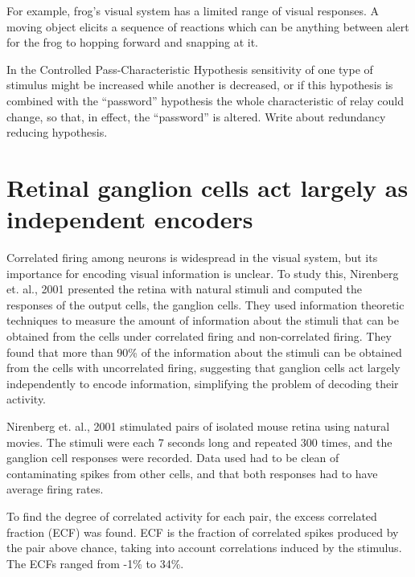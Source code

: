 \documentclass[twoside]{article}
\begin{document}
\begin{multicols}{2}
For example, frog’s visual system has a limited range of visual responses. A moving object elicits a sequence of reactions which can be anything between alert for the frog to hopping forward and snapping at it. 

In the Controlled Pass-Characteristic Hypothesis sensitivity of one type of stimulus might be increased while another is decreased, or if this hypothesis is combined with the ``password'' hypothesis the whole characteristic of relay could change, so that, in effect, the ``password'' is altered. 
Write about redundancy reducing hypothesis. 





\section{Retinal ganglion cells act largely as independent encoders}

\footnotesize
Correlated firing among neurons is widespread in the visual system, but its importance for encoding visual information is unclear. To study this, Nirenberg et. al., 2001 presented the retina with natural stimuli and computed the responses of the output cells, the ganglion cells. They used information theoretic techniques to measure the amount of information about the stimuli that can be obtained from the cells under correlated firing and non-correlated firing. They found that more than 90\% of the information about the stimuli can be obtained from the cells with uncorrelated firing, suggesting that ganglion cells act largely independently to encode information, simplifying the problem of decoding their activity. 

\normalsize
Nirenberg et. al., 2001 stimulated pairs of isolated mouse retina using natural movies. The stimuli were each 7 seconds long and repeated 300 times, and the ganglion cell responses were recorded. Data used had to be clean of contaminating spikes from other cells, and that both responses had to have average firing rates. 

To find the degree of correlated activity for each pair, the excess correlated fraction (ECF) was found. ECF is the fraction of correlated spikes produced by the pair above chance, taking into account correlations induced by the stimulus. The ECFs ranged from -1\% to 34\%. 


\end{multicols}
\end{document}
